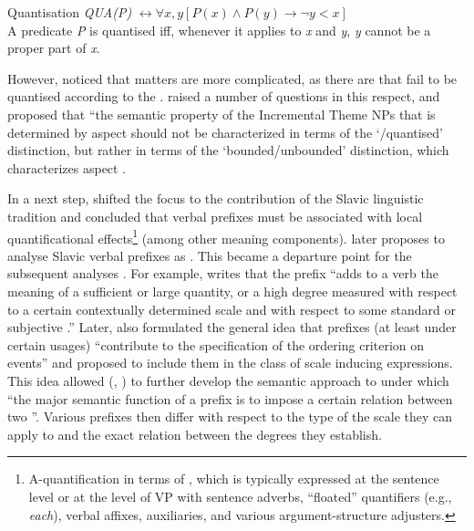 \theoremstyle{definition}
\begin{definition}{Quantisation}\label{def:quant}
\textit{QUA(P)} $\leftrightarrow \forall x,y[P(x) \wedge P(y) \rightarrow \neg y<x]$\\
A predicate \textit{P} is quantised iff, whenever it applies to \textit{x} and \textit{y}, \textit{y} cannot be a proper part of \textit{x}.
\end{definition}

However, \citet{Filip:92} noticed that matters are more complicated, as there are  that fail to be quantised according to the . \citet{Filip:92} raised a number of questions in this respect, and proposed that ``the semantic property of the Incremental Theme NPs that is determined by aspect should not be characterized in terms of the `/quantised' distinction, but rather in terms of the `bounded/unbounded' distinction, which characterizes aspect \citep[][147]{Filip:92}.

In a next step, \citet{Filip:92} shifted the focus to the contribution of the Slavic linguistic tradition \citep{Wierzbicka:67, Rassudova:75, Merrill:85} and concluded that verbal prefixes must be associated with local quantificational effects\footnote{A-quantification in terms of \citealt{BachPartee:87, BachPartee:95}, which is typically expressed at the sentence level or at the level of VP with sentence adverbs, ``floated'' quantifiers (e.g., \textit{each}), verbal affixes, auxiliaries, and various argument-structure adjusters.} (among other meaning components). \citet{Filip:99} later proposes to analyse Slavic verbal prefixes as . This became a departure point for the subsequent analyses \citep{Filip:00, Filip:03, Filip:05, FilipRothstein:05, Kagan:11, Kagan:12, Kagan:13, Kagan:book}. For example, \citet[183]{Filip:99} writes that the prefix  ``adds to a verb the meaning of a sufficient or large quantity, or a high degree measured with respect to a certain contextually determined scale and with respect to some standard or subjective .'' Later, \citet{Filip:08} also formulated the general idea that prefixes (at least under certain usages) ``contribute to the specification of the ordering criterion on events'' and proposed to include them in the class of scale inducing expressions. This idea allowed \citeauthor{Kagan:12} (\citeyear{Kagan:12}, \citeyear{Kagan:book}) to further develop the semantic approach to  under which ``the major semantic function of a prefix is to impose a certain relation between two ''. Various prefixes then differ with respect to the type of the scale they can apply to and the exact relation between the degrees  they establish. 

